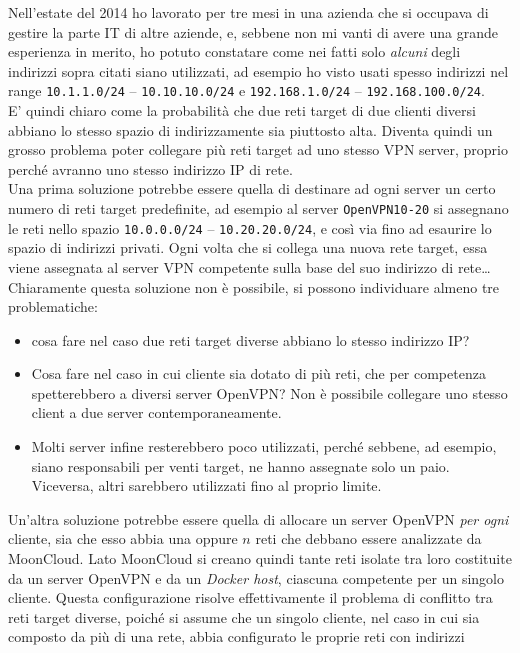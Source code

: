 Nell'estate del 2014 ho lavorato per tre mesi in una azienda che si occupava di
gestire la parte IT di altre aziende, e, sebbene non mi vanti di avere una grande
esperienza in merito, ho potuto constatare come nei fatti solo \textit{alcuni}
degli indirizzi sopra citati siano utilizzati, ad esempio ho visto usati
spesso indirizzi nel range \texttt{10.1.1.0/24} -- \texttt{10.10.10.0/24} e
\texttt{192.168.1.0/24} -- \texttt{192.168.100.0/24}.\\
E' quindi chiaro come la probabilità che due reti target di due clienti diversi
abbiano lo stesso spazio di indirizzamente sia piuttosto alta. Diventa
quindi un grosso problema poter collegare più
reti target ad uno stesso VPN server, proprio perché avranno uno stesso indirizzo IP
di rete.\\
Una prima soluzione potrebbe essere quella di destinare ad ogni server un certo
numero di reti target predefinite, ad esempio al server \texttt{OpenVPN10-20}
si assegnano le reti nello spazio \texttt{10.0.0.0/24} -- \texttt{10.20.20.0/24},
e così via fino ad esaurire lo spazio di indirizzi privati. Ogni volta che
si collega una nuova rete target, essa viene assegnata al server VPN competente
sulla base del suo indirizzo di rete\ldots Chiaramente questa soluzione non è
possibile, si possono individuare almeno tre problematiche:
\begin{itemize}
  \item cosa fare nel caso due reti target diverse abbiano lo stesso indirizzo IP?
  \item Cosa fare nel caso in cui cliente sia dotato di più reti, che per competenza
  spetterebbero a diversi server OpenVPN? Non è possibile collegare uno stesso client
  a due server contemporaneamente.
  \item Molti server infine resterebbero poco utilizzati, perché sebbene, ad esempio,
  siano responsabili per venti target, ne hanno assegnate solo un paio. Viceversa,
  altri sarebbero utilizzati fino al proprio limite.
\end{itemize}
Un'altra soluzione potrebbe essere quella di allocare un server OpenVPN
\textit{per ogni} cliente, sia che esso abbia una oppure $n$ reti che debbano essere
analizzate da MoonCloud. Lato MoonCloud si creano quindi tante reti isolate tra loro
costituite da un server OpenVPN e da un \textit{Docker host}, ciascuna competente
per un singolo cliente. Questa configurazione risolve effettivamente il problema di
conflitto tra reti target diverse, poiché si assume che un singolo cliente, nel caso
in cui sia composto da più di una rete, abbia configurato le proprie reti con indirizzi
